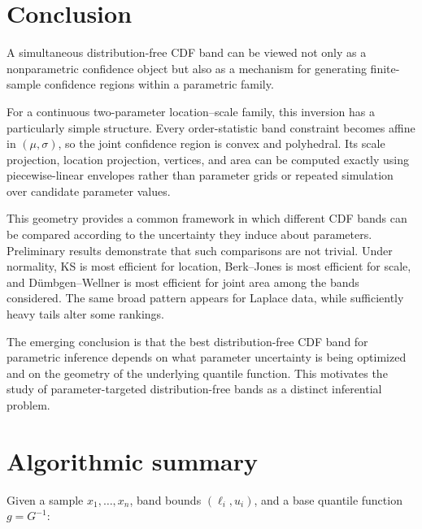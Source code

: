 \documentclass[11pt]{article}
\begin{document}
\section{Conclusion}

A simultaneous distribution-free CDF band can be viewed not only as a
nonparametric confidence object but also as a mechanism for generating
finite-sample confidence regions within a parametric family.

For a continuous two-parameter location--scale family, this inversion
has a particularly simple structure.  Every order-statistic band
constraint becomes affine in $(\mu,\sigma)$, so the joint confidence
region is convex and polyhedral.  Its scale projection, location
projection, vertices, and area can be computed exactly using
piecewise-linear envelopes rather than parameter grids or repeated
simulation over candidate parameter values.

This geometry provides a common framework in which different CDF bands
can be compared according to the uncertainty they induce about
parameters.  Preliminary results demonstrate that such comparisons are
not trivial.  Under normality, KS is most efficient for location,
Berk--Jones is most efficient for scale, and Dümbgen--Wellner is most
efficient for joint area among the bands considered.  The same broad
pattern appears for Laplace data, while sufficiently heavy tails alter
some rankings.

The emerging conclusion is that the best distribution-free CDF band
for parametric inference depends on what parameter uncertainty is being
optimized and on the geometry of the underlying quantile function.
This motivates the study of parameter-targeted distribution-free bands
as a distinct inferential problem.


\appendix

\section{Algorithmic summary}

Given a sample $x_1,\ldots,x_n$, band bounds
$(\ell_i,u_i)$, and a base quantile function $g=G^{-1}$:
\end{document}
